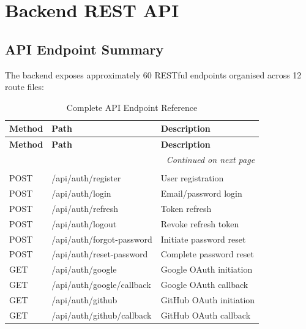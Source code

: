 \documentclass[12pt,a4paper,twoside]{report}
\begin{document}
\section{Backend REST API}

\subsection{API Endpoint Summary}

The backend exposes approximately 60 RESTful endpoints organised across 12 route files:

\begin{longtable}{l|l|p{7cm}}
\caption{Complete API Endpoint Reference} \label{tab:api-endpoints} \\
\toprule
\textbf{Method} & \textbf{Path} & \textbf{Description} \\
\midrule
\endfirsthead
\toprule
\textbf{Method} & \textbf{Path} & \textbf{Description} \\
\midrule
\endhead
\midrule
\multicolumn{3}{r}{\textit{Continued on next page}} \\
\endfoot
\bottomrule
\endlastfoot

\multicolumn{3}{c}{\textbf{Authentication}} \\
\midrule
POST & /api/auth/register & User registration \\
POST & /api/auth/login & Email/password login \\
POST & /api/auth/refresh & Token refresh \\
POST & /api/auth/logout & Revoke refresh token \\
POST & /api/auth/forgot-password & Initiate password reset \\
POST & /api/auth/reset-password & Complete password reset \\
GET & /api/auth/google & Google OAuth initiation \\
GET & /api/auth/google/callback & Google OAuth callback \\
GET & /api/auth/github & GitHub OAuth initiation \\
GET & /api/auth/github/callback & GitHub OAuth callback \\
\midrule


\end{longtable}
\end{document}
